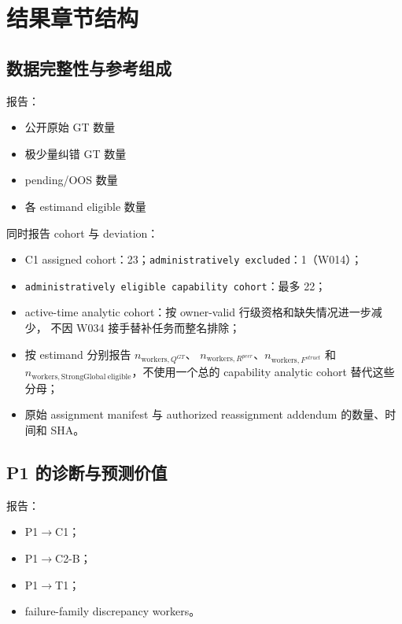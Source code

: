 \section{结果章节结构}

\subsection{数据完整性与参考组成}

报告：
\begin{itemize}
  \item 公开原始 GT 数量
  \item 极少量纠错 GT 数量
  \item pending/OOS 数量
  \item 各 estimand eligible 数量
\end{itemize}

同时报告 cohort 与 deviation：
\begin{itemize}
  \item C1 assigned cohort：23；\texttt{administratively excluded}：1（W014）；
  \item \texttt{administratively eligible capability cohort}：最多 22；
  \item active-time analytic cohort：按 owner-valid 行级资格和缺失情况进一步减少，
  不因 W034 接手替补任务而整名排除；
  \item 按 estimand 分别报告 \(n_{\mathrm{workers},Q^{GT}}\)、
  \(n_{\mathrm{workers},R^{peer}}\)、\(n_{\mathrm{workers},F^{struct}}\) 和
  \(n_{\mathrm{workers},\mathrm{StrongGlobal\ eligible}}\)，不使用一个总的 capability
  analytic cohort 替代这些分母；
  \item 原始 assignment manifest 与 authorized reassignment addendum 的数量、时间和 SHA。
\end{itemize}

\subsection{P1 的诊断与预测价值}

报告：
\begin{itemize}
  \item P1\(\rightarrow\)C1；
  \item P1\(\rightarrow\)C2-B；
  \item P1\(\rightarrow\)T1；
  \item failure-family discrepancy workers。
\end{itemize}

